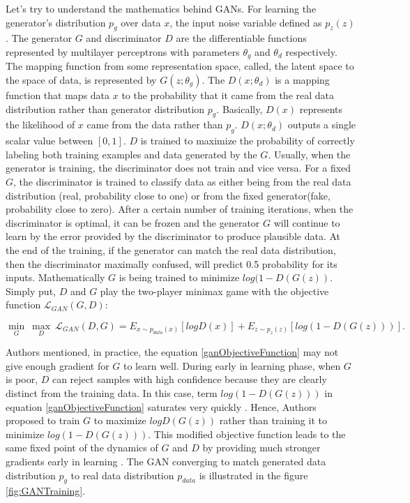 Let's try to understand the mathematics behind \acp{GAN}. For learning the generator’s distribution $p_g$ over data $x$, the input noise variable defined as $p_z(z)$. The generator $G$ and discriminator $D$ are the differentiable functions represented by multilayer perceptrons with parameters $\theta_g$ and $\theta_d$ respectively. The mapping function from some representation space, called, the latent space to the space of data, is represented by $G(z; \theta_g)$. The $D(x; \theta_d)$ is a mapping function that maps data $x$ to the probability that it came from the real data distribution rather than generator distribution $p_g$. Basically, $D(x)$ represents the likelihood of $x$ came from the data rather than $p_g$. $D(x; \theta_d)$ outputs a single scalar value between $[0,1]$. $D$ is trained to maximize the probability of correctly labeling both training examples and data generated by the $G$. Usually, when the generator is training, the discriminator does not train and vice versa. For a fixed $G$, the discriminator is trained to classify data as either being from the real data distribution (real, probability close to one) or from the fixed generator(fake, probability close to zero). After a certain number of training iterations, when the discriminator is optimal, it can be frozen and the generator $G$ will continue to learn by the error provided by the discriminator to produce plausible data. At the end of the training, if the generator can match the real data distribution, then the discriminator maximally confused, will predict 0.5 probability for its inputs. Mathematically $G$ is being trained to minimize $log(1 - D(G(z))$. Simply put, $D$ and $G$ play the two-player minimax game with the objective function $\mathcal{L}_{GAN}(G, D)$:


\begin{equation}\label{ganObjectiveFunction}
\underset{G}{\min}\ \underset{D}{\max}\ \mathcal{L}_{GAN}(D, G) = E_{x\sim p_{data}(x)}[log D(x)] + E_{z\sim p_z(z)}[log(1 - D(G(z)))].
\end{equation}


Authors mentioned, in practice, the equation \ref{ganObjectiveFunction} may not give enough gradient for $G$ to learn well. During early in learning phase, when $G$ is poor, $D$ can reject samples with high confidence because they are clearly distinct from the training data. In this case, term $log(1 - D(G(z)))$ in equation \ref{ganObjectiveFunction} saturates very quickly \cite{goodfellow2014generative}. Hence, Authors proposed to train $G$ to maximize $log D(G(z))$ rather than training it to minimize $log(1 - D(G(z)))$. This modified objective function leads to the same fixed point of the dynamics of $G$ and $D$ by providing much stronger gradients early in learning \cite{goodfellow2014generative}. The \ac{GAN} converging to match generated data distribution $p_g$ to real data distribution $p_{data}$ is illustrated in the figure \ref{fig:GANTraining}.

